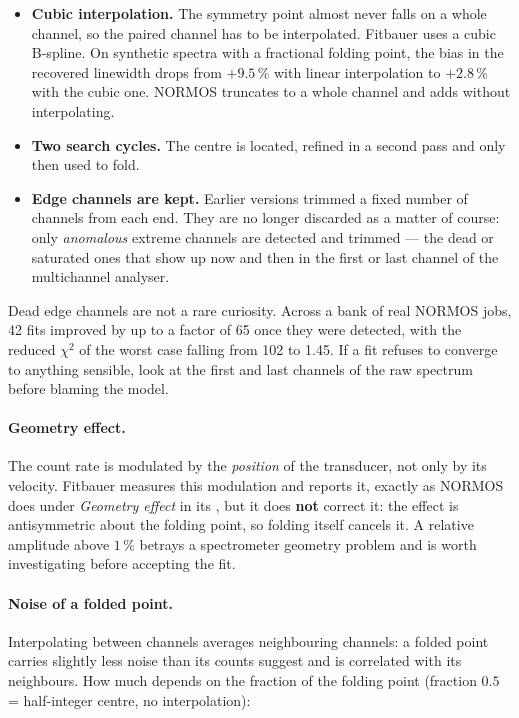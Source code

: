 \begin{itemize}[nosep]
  \item \textbf{Cubic interpolation.} The symmetry point almost never falls on a
        whole channel, so the paired channel has to be interpolated. Fitbauer
        uses a cubic B-spline. On synthetic spectra with a fractional folding
        point, the bias in the recovered linewidth drops from $+9.5\,\%$ with
        linear interpolation to $+2.8\,\%$ with the cubic one. NORMOS truncates
        to a whole channel and adds without interpolating.
  \item \textbf{Two search cycles.} The centre is located, refined in a second
        pass and only then used to fold.
  \item \textbf{Edge channels are kept.} Earlier versions trimmed a fixed number
        of channels from each end. They are no longer discarded as a matter of
        course: only \emph{anomalous} extreme channels are detected and trimmed
        --- the dead or saturated ones that show up now and then in the first or
        last channel of the multichannel analyser.
\end{itemize}

\begin{truco}
Dead edge channels are not a rare curiosity. Across a bank of real NORMOS jobs,
42 fits improved by up to a factor of 65 once they were detected, with the
reduced $\chi^2$ of the worst case falling from 102 to 1.45. If a fit refuses to
converge to anything sensible, look at the first and last channels of the raw
spectrum before blaming the model.
\end{truco}

\paragraph{Geometry effect.} The count rate is modulated by the \emph{position}
of the transducer, not only by its velocity. Fitbauer measures this modulation
and reports it, exactly as NORMOS does under \emph{Geometry effect} in its
, but it does \textbf{not} correct it: the effect is antisymmetric
about the folding point, so folding itself cancels it. A relative amplitude
above $1\,\%$ betrays a spectrometer geometry problem and is worth investigating
before accepting the fit.

\paragraph{Noise of a folded point.} Interpolating between channels averages
neighbouring channels: a folded point carries slightly less noise than its counts
suggest and is correlated with its neighbours. How much depends on the fraction
of the folding point (fraction $0.5$ = half-integer centre, no interpolation):

